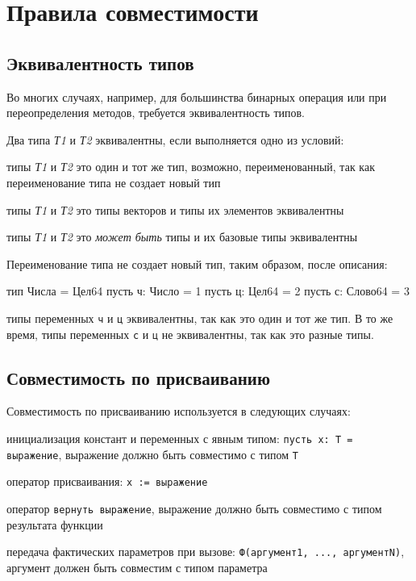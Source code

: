 \hypertarget{compat}{%
\section{Правила совместимости}\label{compat:chapter}}

\hypertarget{equal-types}{%
\subsection{Эквивалентность типов}\label{compat:equal-types}}

Во многих случаях, например, для большинства бинарных операция или при переопределения методов, требуется эквивалентность типов. 

Два типа  \emph{Т1} и \emph{Т2} эквивалентны, если выполняется одно из условий:
\begin{d_itemize}
\item
    типы \emph{Т1} и \emph{Т2} это один и тот же тип, возможно, переименованный, так как переименование типа не создает новый тип
\item
    типы \emph{Т1} и \emph{Т2} это типы векторов и типы их элементов эквивалентны
\item
    типы \emph{Т1} и \emph{Т2} это \emph{может быть} типы и их базовые типы эквивалентны
\end{d_itemize}

Переименование типа не создает новый тип, таким образом, после описания: 
\begin{Trivil}
тип Числа = Цел64 
пусть ч: Число = 1
пусть ц: Цел64 = 2
пусть с: Слово64 = 3
\end{Trivil} 
типы переменных \verb+ч+ и \verb+ц+ эквивалентны, так как это один и тот же тип. В то же время, типы переменных \verb+с+ и \verb+ц+ не эквивалентны, так как это разные типы.

\hypertarget{compat-assign}{%
\subsection{Совместимость по присваиванию}\label{compat:assign}}

Совместимость по присваиванию используется в следующих случаях:
\begin{d_itemize}
\item
    инициализация констант и переменных с явным типом: \verb+пусть х: Т = выражение+, выражение должно быть совместимо с типом \verb+Т+
\item
    оператор присваивания: \verb+х := выражение+
\item
    оператор \verb+вернуть выражение+, выражение должно быть совместимо с типом результата функции
\item
    передача фактических параметров при вызове: \verb+Ф(аргумент1, ..., аргументN)+, аргумент должен быть совместим с типом параметра
\end{d_itemize}

